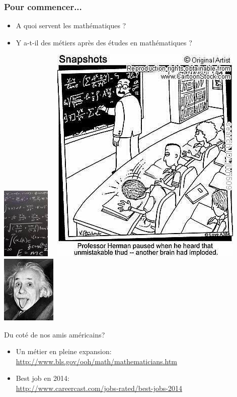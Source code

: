 \documentclass[slideopt,A4]{beamer}
\begin{document}
\begin{frame}
\frametitle{Pour commencer...}

%
%
\begin{itemize}
\item {\large A quoi servent les mathématiques ?}
\item  {\large Y a-t-il des métiers après des études en mathématiques ?}
\end{itemize}
%
\begin{center}
\includegraphics[width=0.20\linewidth]{maths2}$\quad$
\includegraphics[width=0.27\linewidth]{maths1}$\quad$
\includegraphics[width=0.24\linewidth]{einstein}
\end{center}

\begin{block}{Du coté de nos amis américains?}
  \begin{itemize}
  \item Un métier en pleine expansion: \\{\small\url{http://www.bls.gov/ooh/math/mathematicians.htm}}
  \item Best job en 2014:\\ {\small \url{http://www.careercast.com/jobs-rated/best-jobs-2014}}
  \end{itemize}
\end{block}
%
\end{frame}
\end{document}
